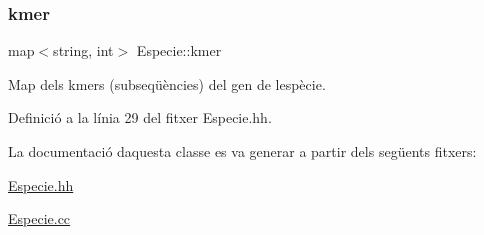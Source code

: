 \subsubsection{\texorpdfstring{kmer}{kmer}}
{\footnotesize\ttfamily map$<$string, int$>$ Especie\+::kmer\hspace{0.3cm}{\ttfamily [private]}}



Map dels kmers (subseqüències) del gen de l\textquotesingle{}espècie. 



Definició a la línia 29 del fitxer Especie.\+hh.



La documentació d\textquotesingle{}aquesta classe es va generar a partir dels següents fitxers\+:\begin{DoxyCompactItemize}
\item 
\hyperlink{_especie_8hh}{Especie.\+hh}\item 
\hyperlink{_especie_8cc}{Especie.\+cc}\end{DoxyCompactItemize}
